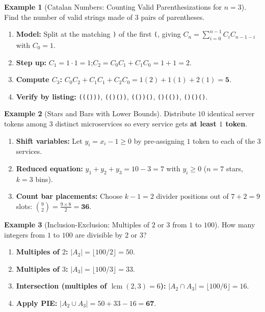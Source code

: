 \documentclass[11pt,a4paper]{article}
\theoremstyle{definition}
\newtheorem{example}{Example}[section]
\begin{document}
\begin{example}[Catalan Numbers: Counting Valid Parenthesizations for $n = 3$]
Find the number of valid strings made of $3$ pairs of parentheses.
\begin{enumerate}
    \item \textbf{Model:} Split at the matching \texttt{)} of the first \texttt{(}, giving $C_n = \sum_{i=0}^{n-1} C_i C_{n-1-i}$ with $C_0 = 1$.
    \item \textbf{Step up:} $C_1 = 1 \cdot 1 = 1$;\quad $C_2 = C_0 C_1 + C_1 C_0 = 1 + 1 = 2$.
    \item \textbf{Compute $C_3$:} $C_0 C_2 + C_1 C_1 + C_2 C_0 = 1(2) + 1(1) + 2(1) = \mathbf{5}$.
    \item \textbf{Verify by listing:} \texttt{((()))}, \texttt{(()())}, \texttt{(())()}, \texttt{()(())}, \texttt{()()()}.
\end{enumerate}
\end{example}

\begin{example}[Stars and Bars with Lower Bounds]
Distribute $10$ identical server tokens among $3$ distinct microservices so every service gets \textbf{at least $1$ token}.
\begin{enumerate}
    \item \textbf{Shift variables:} Let $y_i = x_i - 1 \ge 0$ by pre-assigning $1$ token to each of the $3$ services.
    \item \textbf{Reduced equation:} $y_1 + y_2 + y_3 = 10 - 3 = 7$ with $y_i \ge 0$ ($n = 7$ stars, $k = 3$ bins).
    \item \textbf{Count bar placements:} Choose $k - 1 = 2$ divider positions out of $7 + 2 = 9$ slots: $\binom{9}{2} = \frac{9 \times 8}{2} = \mathbf{36}$.
\end{enumerate}
\end{example}

\begin{example}[Inclusion-Exclusion: Multiples of $2$ or $3$ from $1$ to $100$]
How many integers from $1$ to $100$ are divisible by $2$ or $3$?
\begin{enumerate}
    \item \textbf{Multiples of $2$:} $|A_2| = \lfloor 100 / 2 \rfloor = 50$.
    \item \textbf{Multiples of $3$:} $|A_3| = \lfloor 100 / 3 \rfloor = 33$.
    \item \textbf{Intersection (multiples of $\operatorname{lcm}(2, 3) = 6$):} $|A_2 \cap A_3| = \lfloor 100 / 6 \rfloor = 16$.
    \item \textbf{Apply PIE:} $|A_2 \cup A_3| = 50 + 33 - 16 = \mathbf{67}$.
\end{enumerate}
\end{example}
\end{document}
